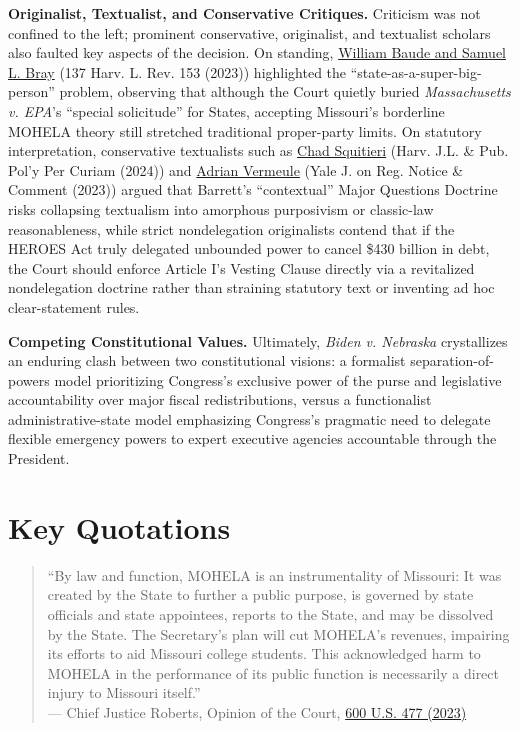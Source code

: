 \documentclass[12pt]{article}
\begin{document}
\textbf{Originalist, Textualist, and Conservative Critiques.} Criticism was not confined to the left; prominent conservative, originalist, and textualist scholars also faulted key aspects of the decision. On standing, \href{https://harvardlawreview.org/print/vol-137/proper-parties-proper-relief/}{William Baude and Samuel L. Bray} (137 Harv. L. Rev. 153 (2023)) highlighted the ``state-as-a-super-big-person'' problem, observing that although the Court quietly buried \textit{Massachusetts v. EPA}'s ``special solicitude'' for States, accepting Missouri's borderline MOHELA theory still stretched traditional proper-party limits. On statutory interpretation, conservative textualists such as \href{https://journals.law.harvard.edu/jlpp/placing-legal-context-in-context-chad-squitieri/}{Chad Squitieri} (Harv. J.L. \& Pub. Pol'y Per Curiam (2024)) and \href{https://www.yalejreg.com/nc/text-and-context-by-adrian-vermeule/}{Adrian Vermeule} (Yale J. on Reg. Notice \& Comment (2023)) argued that Barrett's ``contextual'' Major Questions Doctrine risks collapsing textualism into amorphous purposivism or classic-law reasonableness, while strict nondelegation originalists contend that if the HEROES Act truly delegated unbounded power to cancel \$430 billion in debt, the Court should enforce Article I's Vesting Clause directly via a revitalized nondelegation doctrine rather than straining statutory text or inventing ad hoc clear-statement rules.

\textbf{Competing Constitutional Values.} Ultimately, \textit{Biden v. Nebraska} crystallizes an enduring clash between two constitutional visions: a formalist separation-of-powers model prioritizing Congress's exclusive power of the purse and legislative accountability over major fiscal redistributions, versus a functionalist administrative-state model emphasizing Congress's pragmatic need to delegate flexible emergency powers to expert executive agencies accountable through the President.

\section{Key Quotations}

\begin{quote}
``By law and function, MOHELA is an instrumentality of Missouri: It was created by the State to further a public purpose, is governed by state officials and state appointees, reports to the State, and may be dissolved by the State. The Secretary's plan will cut MOHELA's revenues, impairing its efforts to aid Missouri college students. This acknowledged harm to MOHELA in the performance of its public function is necessarily a direct injury to Missouri itself.''\\
--- Chief Justice Roberts, Opinion of the Court, \href{https://www.law.cornell.edu/supremecourt/text/22-506}{600 U.S. 477 (2023)}
\end{quote}
\end{document}
